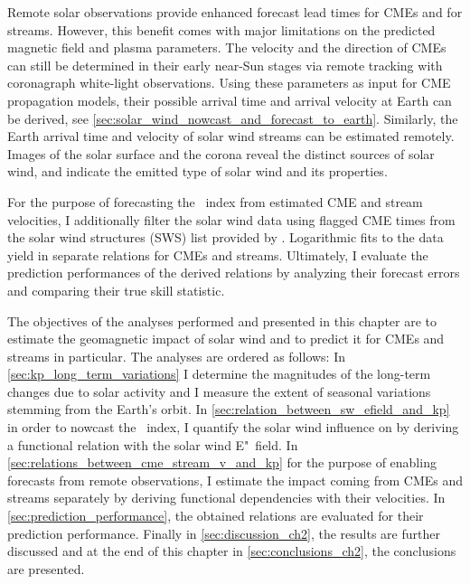 Remote solar observations provide enhanced forecast lead times for CMEs and for streams. However, this benefit comes with major limitations on the predicted magnetic field and plasma parameters. The velocity and the direction of CMEs can still be determined in their early near-Sun stages via remote tracking with coronagraph white-light observations. Using these parameters as input for CME propagation models, their possible arrival time and arrival velocity at Earth can be derived, see \autoref{sec:solar_wind_nowcast_and_forecast_to_earth}. Similarly, the Earth arrival time and velocity of solar wind streams can be estimated remotely. Images of the solar surface and the corona reveal the distinct sources of solar wind, and indicate the emitted type of solar wind and its properties.

For the purpose of forecasting the \Kp~index from estimated CME and stream velocities, I additionally filter the solar wind data using flagged CME times from the solar wind structures (SWS) list provided by \citet{Richardson2012}. Logarithmic fits to the data yield in separate \Kp{} relations for CMEs and streams.
Ultimately, I evaluate the prediction performances of the derived relations by analyzing their forecast errors and comparing their true skill statistic.

The objectives of the analyses performed and presented in this chapter are to estimate the geomagnetic impact of solar wind and to predict it for CMEs and streams in particular. The analyses are ordered as follows: In \autoref{sec:kp_long_term_variations} I determine the magnitudes of the long-term \Kp{} changes due to solar activity and I measure the extent of seasonal variations stemming from the Earth's orbit. In \autoref{sec:relation_between_sw_efield_and_kp} in order to nowcast the \Kp~index, I quantify the solar wind influence on \Kp{} by deriving a functional relation with the solar wind E"~field. In \autoref{sec:relations_between_cme_stream_v_and_kp} for the purpose of enabling \Kp{} forecasts from remote observations, I estimate the \Kp{} impact coming from CMEs and streams separately by deriving functional dependencies with their velocities. In \autoref{sec:prediction_performance}, the obtained \Kp{} relations are evaluated for their prediction performance. Finally in \autoref{sec:discussion_ch2}, the results are further discussed and at the end of this chapter in \autoref{sec:conclusions_ch2}, the conclusions are presented.

\clearpage

